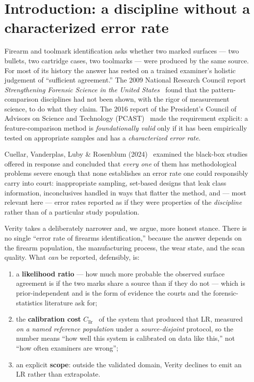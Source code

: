 \documentclass[11pt]{article}
\newcommand{\Cllr}{C_{\mathrm{llr}}}
\begin{document}
\section{Introduction: a discipline without a characterized error rate}
\label{sec:intro}

Firearm and toolmark identification asks whether two marked surfaces --- two
bullets, two cartridge cases, two toolmarks --- were produced by the same source.
For most of its history the answer has rested on a trained examiner's holistic
judgement of ``sufficient agreement.'' The 2009 National Research Council report
\emph{Strengthening Forensic Science in the United States}~\cite{nrc2009} found that
the pattern-comparison disciplines had not been shown, with the rigor of
measurement science, to do what they claim. The 2016 report of the President's
Council of Advisors on Science and Technology (PCAST)~\cite{pcast2016} made the
requirement explicit: a feature-comparison method is \emph{foundationally valid}
only if it has been empirically tested on appropriate samples and has a
\emph{characterized error rate}.

Cuellar, Vanderplas, Luby \& Rosenblum (2024)~\cite{cuellar2024} examined the
black-box studies offered in response and concluded that \emph{every one} of them
has methodological problems severe enough that none establishes an error rate one
could responsibly carry into court: inappropriate sampling, set-based designs that
leak class information, inconclusives handled in ways that flatter the method, and
--- most relevant here --- error rates reported as if they were properties of the
\emph{discipline} rather than of a particular study population.

Verity takes a deliberately narrower and, we argue, more honest stance. There is
no single ``error rate of firearms identification,'' because the answer depends on
the firearm population, the manufacturing process, the wear state, and the scan
quality. What \emph{can} be reported, defensibly, is:

\begin{enumerate}
  \item a \textbf{likelihood ratio} --- how much more probable the observed surface
        agreement is if the two marks share a source than if they do not --- which
        is prior-independent and is the form of evidence the courts and the
        forensic-statistics literature ask for;
  \item the \textbf{calibration cost} $\Cllr$~\cite{brummer2006} of the system that
        produced that LR, measured \emph{on a named reference population} under a
        \emph{source-disjoint} protocol, so the number means ``how well this system
        is calibrated on data like this,'' not ``how often examiners are wrong'';
  \item an explicit \textbf{scope}: outside the validated domain, Verity declines to
        emit an LR rather than extrapolate.
\end{enumerate}
\end{document}
